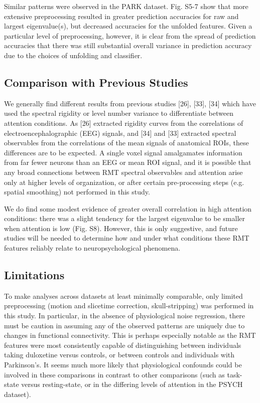 Similar patterns were observed in the PARK dataset. Fig. S5-7 show that more extensive preprocessing
resulted in greater prediction accuracies for raw and largest eigenvalue(s), but decreased
accuracies for the unfolded features. Given a particular level of preprocessing, however, it is
clear from the spread of prediction accuracies that there was still substantial overall variance in
prediction accuracy due to the choices of unfolding and classifier.

\subsection{Comparison with Previous Studies}

We generally find different results from previous studies [26], [33], [34] which have used the
spectral rigidity or level number variance to differentiate between attention conditions. As [26]
extracted rigidity curves from the correlations of electroencephalographic (EEG) signals, and [34]
and [33] extracted spectral observables from the correlations of the mean signals of anatomical
ROIs, these differences are to be expected. A single voxel signal amalgamates information from far
fewer neurons than an EEG or mean ROI signal, and it is possible that any broad connections between
RMT spectral observables and attention arise only at higher levels of organization, or after certain
pre-processing steps (e.g. spatial smoothing) not performed in this study.

We do find some modest evidence of greater overall correlation in high attention conditions: there
was a slight tendency for the largest eigenvalue to be smaller when attention is low (Fig. S8).
However, this is only suggestive, and future studies will be needed to determine how and under what
conditions these RMT features reliably relate to neuropsychological phenomena.

\subsection{Limitations}

To make analyses across datasets at least minimally comparable, only limited preprocessing (motion
and slicetime correction, skull-stripping) was performed in this study. In particular, in the
absence of physiological noise regression, there must be caution in assuming any of the observed
patterns are uniquely due to changes in functional connectivity. This is perhaps especially notable
as the RMT features were most consistently capable of distinguishing between individuals taking
duloxetine versus controls, or between controls and individuals with Parkinson's. It seems much more
likely that physiological confounds could be involved in these comparisons in contrast to other
comparisons (such as task-state versus resting-state, or in the differing levels of attention in the
PSYCH dataset).

